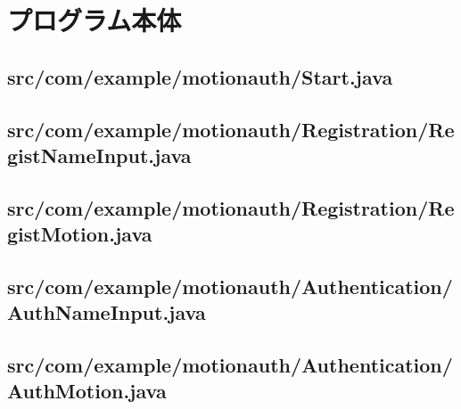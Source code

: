 \documentclass[12pt]{jreport}
\renewcommand{\slash}{/}
\begin{document}
\chapter{プログラム本体}
    \section{src\slash com\slash example\slash motionauth\slash Start.java}
    

    \section{src\slash com\slash example\slash motionauth\slash Registration\slash RegistNameInput.java}
    

    \section{src\slash com\slash example\slash motionauth\slash Registration\slash RegistMotion.java}
    

    \section{src\slash com\slash example\slash motionauth\slash Authentication\slash AuthNameInput.java}
    

    \section{src\slash com\slash example\slash motionauth\slash Authentication\slash AuthMotion.java}
    
\end{document}
